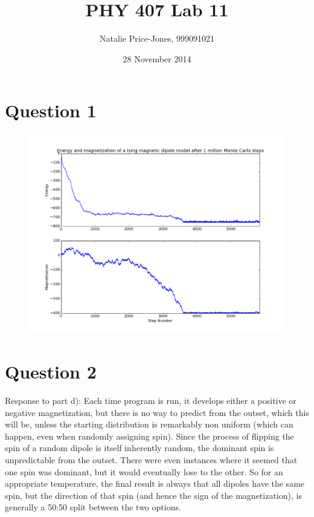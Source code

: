\documentclass[a4paper,12pt]{article}
\begin{document}
\onehalfspacing
\title{PHY 407 Lab 11}
\author{Natalie Price-Jones, 999091021}
\date{28 November 2014}
\maketitle

\section{Question 1}

\begin{figure}[H]
\centering
\includegraphics[width = \linewidth]{lab11q1.png}
\caption{}
\label{fig:q1}
\end{figure}


\section{Question 2}

Response to part d): Each time program is run, it develops either a positive or negative magnetization, but there is no way to predict from the outset, which this will be, unless the starting distribution is remarkably non uniform (which can happen, even when randomly assigning spin). Since the process of flipping the spin of a random dipole is itself inherently random, the dominant spin is unpredictable from the outset. There were even instances where it seemed that one spin was dominant, but it would eventually lose to the other. So for an appropriate temperature, the final result is always that all dipoles have the same spin, but the direction of that spin (and hence the sign of the magnetization), is generally a 50:50 split between the two options.
\end{document}
